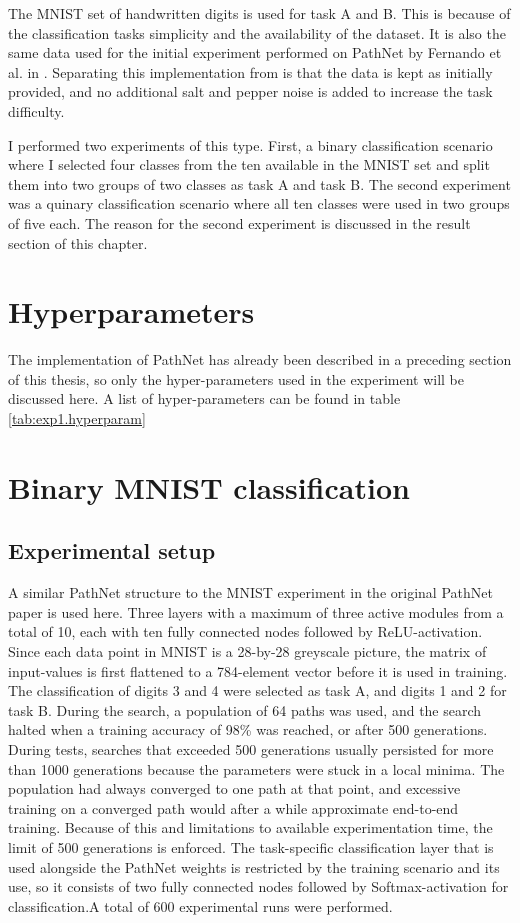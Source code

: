 The MNIST set of handwritten digits is used for task A and B. This is because of the classification tasks simplicity and the availability of the dataset. It is also the same data used for the initial experiment performed on PathNet by Fernando et al. in \cite{pathnet}. Separating this implementation from \cite{pathnet} is that the data is kept as initially provided, and no additional salt and pepper noise is added to increase the task difficulty. 


I performed two experiments of this type. First, a binary classification scenario where I selected four classes from the ten available in the MNIST set and split them into two groups of two classes as task A and task B. The second experiment was a quinary classification scenario where all ten classes were used in two groups of five each. The reason for the second experiment is discussed in the result section of this chapter. 

\section{Hyperparameters}
\label{exp1:implementation}
The implementation of PathNet has already been described in a preceding section of this thesis, so only the hyper-parameters used in the experiment will be discussed here. A list of hyper-parameters can be found in table \ref{tab:exp1.hyperparam}



\section{Binary MNIST classification}

\subsection{Experimental setup}
A similar PathNet structure to the MNIST experiment in the original PathNet paper is used here. 
Three layers with a maximum of three active modules from a total of 10, each with ten fully connected nodes followed by ReLU-activation. Since each data point in MNIST is a 28-by-28 greyscale picture, the matrix of input-values is first flattened to a 784-element vector before it is used in training. The classification of digits 3 and 4 were selected as task A, and digits 1 and 2 for task B. 
During the search, a population of 64 paths was used, and the search halted when a training accuracy of 98\% was reached, or after 500 generations. During tests, searches that exceeded 500 generations usually persisted for more than 1000 generations because the parameters were stuck in a local minima. The population had always converged to one path at that point, and excessive training on a converged path would after a while approximate end-to-end training. Because of this and limitations to available experimentation time, the limit of 500 generations is enforced. The task-specific classification layer that is used alongside the PathNet weights is restricted by the training scenario and its use, so it consists of two fully connected nodes followed by Softmax-activation for classification.A total of 600 experimental runs were performed.


